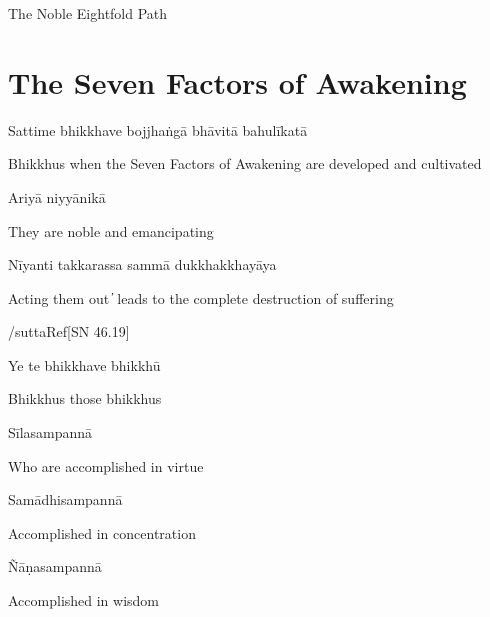 \begin{cprenglish}
  The Noble Eightfold Path
\end{cprenglish}

\suttaRef{[DN 16]}

\clearpage

\section{The Seven Factors of Awakening}

\begin{leader}
\end{leader}

Sattime bhikkhave bojjhaṅgā bhāvitā bahulīkatā

\begin{cprenglish}
  Bhikkhus when the Seven Factors of Awakening are developed and cultivated
\end{cprenglish}

Ariyā niyyānikā

\begin{cprenglish}
  They are noble and emancipating
\end{cprenglish}

Nīyanti takkarassa sammā dukkhakkhayāya

\begin{cprenglish}
  Acting them out  ̓  leads to the complete destruction of suffering
\end{cprenglish}

/suttaRef{[SN 46.19]}

Ye te bhikkhave bhikkhū

\begin{cprenglish}
  Bhikkhus those bhikkhus
\end{cprenglish}

Sīlasampannā

\begin{cprenglish}
  Who are accomplished in virtue
\end{cprenglish}

Samādhisampannā

\begin{cprenglish}
  Accomplished in concentration
\end{cprenglish}

Ñāṇasampannā

\begin{cprenglish}
  Accomplished in wisdom
\end{cprenglish}

